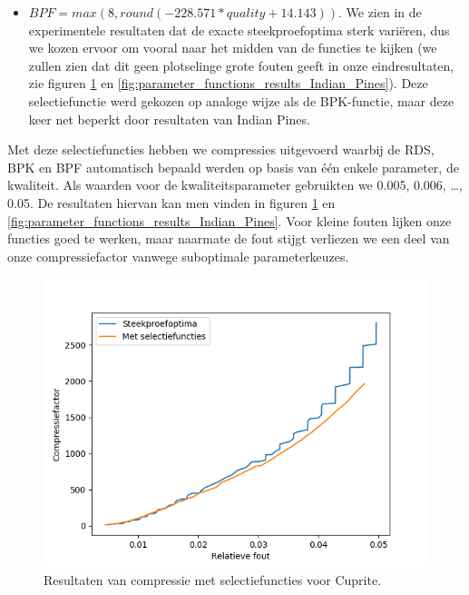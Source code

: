 \begin{itemize}
\item $BPF = max(8, round(-228.571*quality + 14.143))$. We zien in de experimentele resultaten dat de exacte steekproefoptima sterk vari\"eren, dus we kozen ervoor om vooral naar het midden van de functies te kijken (we zullen zien dat dit geen plotselinge grote fouten geeft in onze eindresultaten, zie figuren \ref{fig:parameter_functions_results_Cuprite} en \ref{fig:parameter_functions_results_Indian_Pines}). Deze selectiefunctie werd gekozen op analoge wijze als de BPK-functie, maar deze keer net beperkt door resultaten van Indian Pines.
\end{itemize}

Met deze selectiefuncties hebben we compressies uitgevoerd waarbij de RDS, BPK en BPF automatisch bepaald werden op basis van \'e\'en enkele parameter, de kwaliteit. Als waarden voor de kwaliteitsparameter gebruikten we 0.005, 0.006, \dots, 0.05. De resultaten hiervan kan men vinden in figuren \ref{fig:parameter_functions_results_Cuprite} en \ref{fig:parameter_functions_results_Indian_Pines}. Voor kleine fouten lijken onze functies goed te werken, maar naarmate de fout stijgt verliezen we een deel van onze compressiefactor vanwege suboptimale parameterkeuzes.

\newpage
\begin{figure}[H]
  \centering
  \includegraphics[scale=0.7]{images/parameter_functions_results_Cuprite.png}
  \caption{Resultaten van compressie met selectiefuncties voor Cuprite.}
  \label{fig:parameter_functions_results_Cuprite}
\end{figure}

